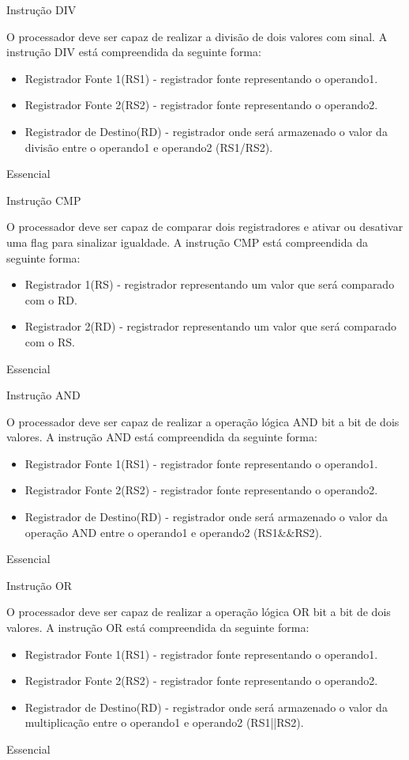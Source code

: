 \documentclass{article}
\begin{document}
\begin{functional}
       \requirement
      {Instrução DIV}
      {O processador deve ser capaz de realizar a divisão de dois valores com sinal.
      A instrução DIV está compreendida da seguinte forma:
       \begin{itemize}
        \item Registrador Fonte 1(RS1) - registrador fonte representando o operando1.
        \item Registrador Fonte 2(RS2) - registrador fonte representando o operando2.
        \item Registrador de Destino(RD) - registrador onde será armazenado o valor da divisão entre o operando1 e operando2 (RS1/RS2).
       \end{itemize}}
      {Essencial}

     \requirement
      {Instrução CMP}
      {O processador deve ser capaz de comparar dois registradores e ativar ou desativar uma flag para sinalizar igualdade.
      A instrução CMP está compreendida da seguinte forma:
      \begin{itemize}
       \item Registrador 1(RS) - registrador representando um valor que será comparado com o RD.
       \item Registrador 2(RD) - registrador representando um valor que será comparado com o RS.
      \end{itemize}

      {Essencial}

      \requirement
      {Instrução AND}
      {O processador deve ser capaz de realizar a operação lógica AND bit a bit de dois valores.
      A instrução AND está compreendida da seguinte forma:
       \begin{itemize}
        \item Registrador Fonte 1(RS1) - registrador fonte representando o operando1.
        \item Registrador Fonte 2(RS2) - registrador fonte representando o operando2.
        \item Registrador de Destino(RD) - registrador onde será armazenado o valor da operação AND entre o operando1 e operando2 (RS1&&RS2).
       \end{itemize}}
      {Essencial}

      \requirement
      {Instrução OR}
      {O processador deve ser capaz de realizar a operação lógica OR bit a bit de dois valores.
      A instrução OR está compreendida da seguinte forma:
       \begin{itemize}
        \item Registrador Fonte 1(RS1) - registrador fonte representando o operando1.
        \item Registrador Fonte 2(RS2) - registrador fonte representando o operando2.
        \item Registrador de Destino(RD) - registrador onde será armazenado o valor da multiplicação entre o operando1 e operando2 (RS1||RS2).
       \end{itemize}}
      {Essencial}

}
\end{functional}
\end{document}
